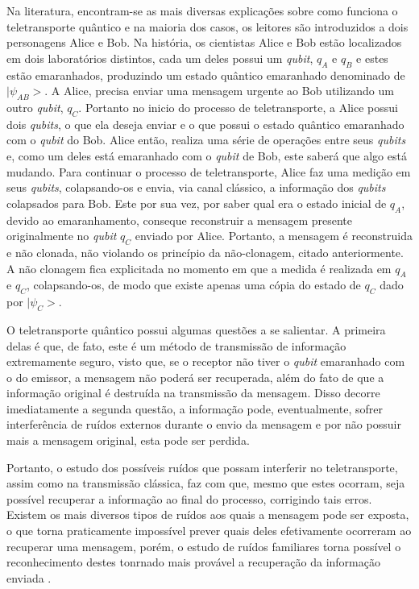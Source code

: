 \documentclass[11pt,oneside,brazil,hidelinks,article,sumario=tradicional,a4paper]{abntex2}
\begin{document}
Na literatura, encontram-se as mais diversas explicações sobre como funciona o teletransporte quântico \cites{bennet}{experimentalqt}{zeilinger}{brassard1996teleportation}{materialdidaticomecquantica} e na maioria dos casos, os leitores são introduzidos a dois personagens Alice e Bob.
Na história, os cientistas Alice e Bob estão localizados em dois laboratórios distintos, cada um deles possui um \textit{qubit}, $q_{A}$ e $q_{B}$ e estes estão emaranhados, produzindo um estado quântico emaranhado denominado de $|\psi_{AB}>$. A Alice, precisa enviar uma mensagem urgente ao Bob utilizando um outro \textit{qubit}, $q_{C}$. Portanto no inicio do processo de teletransporte, a Alice possui dois \textit{qubits}, o que ela deseja enviar e o que possui o estado quântico emaranhado com o \textit{qubit} do Bob.
Alice então, realiza uma série de operações entre seus \textit{qubits} e, como um deles está emaranhado com o \textit{qubit} de Bob, este saberá que algo está mudando. Para continuar o processo de teletransporte, Alice faz uma medição em seus \textit{qubits}, colapsando-os e envia, via canal clássico, a informação dos \textit{qubits} colapsados para Bob. Este por sua vez, por saber qual era o estado inicial de $q_{A}$, devido ao emaranhamento, conseque reconstruir a mensagem presente originalmente no \textit{qubit} $q_{C}$ enviado por Alice. Portanto, a mensagem é reconstruida e não clonada, não violando os princípio da não-clonagem, citado anteriormente. A não clonagem fica explicitada no momento em que a medida é realizada em $q_{A}$ e $q_{C}$, colapsando-os, de modo que existe apenas uma cópia do estado de $q_{C}$ dado por $|\psi_{C}>$. 

O teletransporte quântico possui algumas questões a se salientar. A primeira delas é que, de fato, este é um método de transmissão de informação extremamente seguro, visto que, se o receptor não tiver o \textit{qubit} emaranhado com o do emissor, a mensagem não poderá ser recuperada, além do fato de que a informação original é destruída na transmissão da mensagem. Disso decorre imediatamente a segunda questão, a informação pode, eventualmente, sofrer interferência de ruídos externos durante o envio da mensagem e por não possuir mais a mensagem original, esta pode ser perdida.

Portanto, o estudo dos possíveis ruídos que possam interferir no teletransporte, assim como na transmissão clássica, faz com que, mesmo que estes ocorram, seja possível recuperar a informação ao final do processo, corrigindo tais erros. Existem os mais diversos tipos de ruídos aos quais a mensagem pode ser exposta, o que torna praticamente impossível prever quais deles efetivamente ocorreram ao recuperar uma mensagem, porém, o estudo de ruídos familiares torna possível o reconhecimento destes tonrnado mais provável a recuperação da informação enviada \cite{fonzar}.
\end{document}
